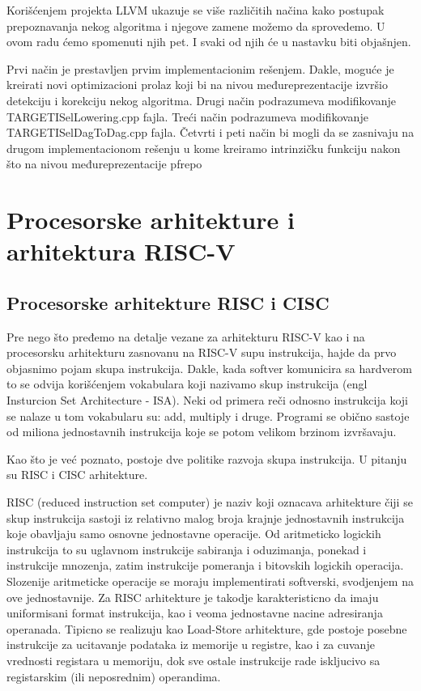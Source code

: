 \documentclass[12pt,oneside]{memoir}
\begin{document}
Korišćenjem projekta LLVM ukazuje se više različitih načina kako postupak prepoznavanja nekog algoritma i njegove zamene možemo da sprovedemo. U ovom radu ćemo spomenuti njih pet. I svaki od njih će u nastavku biti objašnjen.

Prvi način je prestavljen prvim implementacionim rešenjem. Dakle, moguće je kreirati novi optimizacioni prolaz koji bi na nivou međureprezentacije izvršio detekciju i korekciju nekog algoritma. 
Drugi način podrazumeva modifikovanje TARGETISelLowering.cpp fajla.
Treći način podrazumeva modifikovanje TARGETISelDagToDag.cpp fajla.
Četvrti i peti način bi mogli da se zasnivaju na drugom implementacionom rešenju u kome kreiramo intrinzičku funkciju nakon što na nivou međureprezentacije pfrepo 
\chapter{Procesorske arhitekture i arhitektura RISC-V}
\section{Procesorske arhitekture RISC i CISC}
Pre nego što pređemo na detalje vezane za arhitekturu RISC-V kao i na procesorsku arhitekturu zasnovanu na RISC-V supu instrukcija, hajde da prvo objasnimo pojam skupa instrukcija.
Dakle, kada softver komunicira sa hardverom to se odvija korišćenjem vokabulara koji nazivamo skup instrukcija (engl Insturcion Set Architecture - ISA). Neki od primera reči odnosno instrukcija koji se nalaze u tom vokabularu su: add, multiply i druge. Programi se obično sastoje od miliona jednostavnih instrukcija koje se potom velikom brzinom izvršavaju.  

Kao što je već poznato, postoje dve politike razvoja skupa instrukcija. U pitanju su RISC i CISC arhitekture. 

RISC (reduced instruction set computer) je naziv koji oznacava arhitekture čiji se skup 
instrukcija sastoji iz relativno malog broja krajnje jednostavnih instrukcija koje obavljaju samo 
osnovne jednostavne operacije. Od aritmeticko logickih instrukcija to su uglavnom instrukcije 
sabiranja i oduzimanja, ponekad i instrukcije mnozenja, zatim instrukcije pomeranja i bitovskih 
logickih operacija.  Slozenije aritmeticke operacije se moraju implementirati softverski, 
svodjenjem na ove jednostavnije. Za RISC arhitekture je takodje karakteristicno da imaju 
uniformisani format instrukcija, kao i veoma jednostavne nacine adresiranja operanada. Tipicno se 
realizuju kao Load-Store arhitekture, gde postoje posebne instrukcije za ucitavanje podataka iz 
memorije u registre, kao i za cuvanje vrednosti registara u memoriju, dok sve ostale instrukcije
rade iskljucivo sa registarskim (ili neposrednim) operandima.
\end{document}
